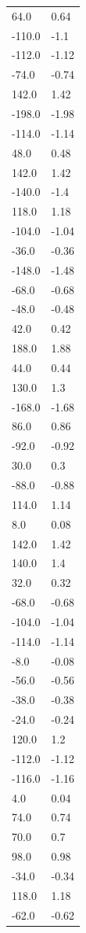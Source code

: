 \begin{longtable}{ll}
64.0 & 0.64 \\
-110.0 & -1.1 \\
-112.0 & -1.12 \\
-74.0 & -0.74 \\
142.0 & 1.42 \\
-198.0 & -1.98 \\
-114.0 & -1.14 \\
48.0 & 0.48 \\
142.0 & 1.42 \\
-140.0 & -1.4 \\
118.0 & 1.18 \\
-104.0 & -1.04 \\
-36.0 & -0.36 \\
-148.0 & -1.48 \\
-68.0 & -0.68 \\
-48.0 & -0.48 \\
42.0 & 0.42 \\
188.0 & 1.88 \\
44.0 & 0.44 \\
130.0 & 1.3 \\
-168.0 & -1.68 \\
86.0 & 0.86 \\
-92.0 & -0.92 \\
30.0 & 0.3 \\
-88.0 & -0.88 \\
114.0 & 1.14 \\
8.0 & 0.08 \\
142.0 & 1.42 \\
140.0 & 1.4 \\
32.0 & 0.32 \\
-68.0 & -0.68 \\
-104.0 & -1.04 \\
-114.0 & -1.14 \\
-8.0 & -0.08 \\
-56.0 & -0.56 \\
-38.0 & -0.38 \\
-24.0 & -0.24 \\
120.0 & 1.2 \\
-112.0 & -1.12 \\
-116.0 & -1.16 \\
4.0 & 0.04 \\
74.0 & 0.74 \\
70.0 & 0.7 \\
98.0 & 0.98 \\
-34.0 & -0.34 \\
118.0 & 1.18 \\
-62.0 & -0.62 \\

\end{longtable}

